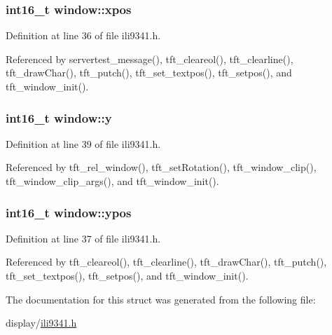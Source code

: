 \subsubsection[{\texorpdfstring{xpos}{xpos}}]{\setlength{\rightskip}{0pt plus 5cm}int16\+\_\+t window\+::xpos}\hypertarget{structwindow_a890a7dba31e7328500f4e5e41e51aab7}{}\label{structwindow_a890a7dba31e7328500f4e5e41e51aab7}


Definition at line 36 of file ili9341.\+h.



Referenced by servertest\+\_\+message(), tft\+\_\+cleareol(), tft\+\_\+clearline(), tft\+\_\+draw\+Char(), tft\+\_\+putch(), tft\+\_\+set\+\_\+textpos(), tft\+\_\+setpos(), and tft\+\_\+window\+\_\+init().

\subsubsection[{\texorpdfstring{y}{y}}]{\setlength{\rightskip}{0pt plus 5cm}int16\+\_\+t window\+::y}\hypertarget{structwindow_a95c7023fc42e79ab42c291b90a490776}{}\label{structwindow_a95c7023fc42e79ab42c291b90a490776}


Definition at line 39 of file ili9341.\+h.



Referenced by tft\+\_\+rel\+\_\+window(), tft\+\_\+set\+Rotation(), tft\+\_\+window\+\_\+clip(), tft\+\_\+window\+\_\+clip\+\_\+args(), and tft\+\_\+window\+\_\+init().

\subsubsection[{\texorpdfstring{ypos}{ypos}}]{\setlength{\rightskip}{0pt plus 5cm}int16\+\_\+t window\+::ypos}\hypertarget{structwindow_a64bdec4f0ee274a96d696b16de783746}{}\label{structwindow_a64bdec4f0ee274a96d696b16de783746}


Definition at line 37 of file ili9341.\+h.



Referenced by tft\+\_\+cleareol(), tft\+\_\+clearline(), tft\+\_\+draw\+Char(), tft\+\_\+putch(), tft\+\_\+set\+\_\+textpos(), tft\+\_\+setpos(), and tft\+\_\+window\+\_\+init().



The documentation for this struct was generated from the following file\+:\begin{DoxyCompactItemize}
\item 
display/\hyperlink{ili9341_8h}{ili9341.\+h}\end{DoxyCompactItemize}
